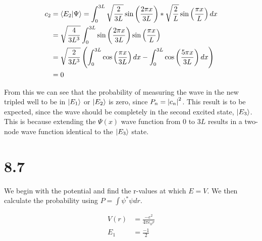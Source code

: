 \documentclass[10pt]{article} %
\begin{document}
\begin{align*}
  c_2 &= \braket{E_2}{\Psi} = \int_0^{3L} \sqrt{\frac{2}{3L}}\sin\left(\frac{2\pi x}{3L}\right)*
  \sqrt{\frac{2}{L}}\sin\left(\frac{\pi x}{L}\right)dx\\
  &= \sqrt{\frac{4}{3L^3}}\int_0^{3L}
  \sin\left(\frac{2\pi x}{3L}\right)\sin\left(\frac{\pi x}{L}\right)\\
  &= \sqrt{\frac{2}{3L^3}}\left(\int_0^{3L} \cos\left(\frac{\pi x}{3L}\right)dx
  - \int_0^{3L} \cos\left(\frac{5\pi x}{3L}\right)dx\right)\\
  &= 0\\
\end{align*}

From this we can see that the probability of measuring the wave in the new tripled well to be in
$\ket{E_1}$ or $\ket{E_2}$ is zero, since $P_n = \abs{c_n}^2$. This result is to be expected, since
the wave should be completely in the second excited state, $\ket{E_3}$. This is because extending
the $\Psi(x)$ wave function from $0$ to $3L$ results in a two-node wave function identical to the
$\ket{E_3}$ state.\\

\section{8.7}
We begin with the potential and find the r-values at which $E=V$. We then calculate
the probability using $P = \int \psi^* \psi dr$.

\begin{align*}
  V(r) &= \frac{-e^2}{4\pi\epsilon_0r}\\
  E_1 &= \frac{-1}{2}
\end{align*}
\end{document}
